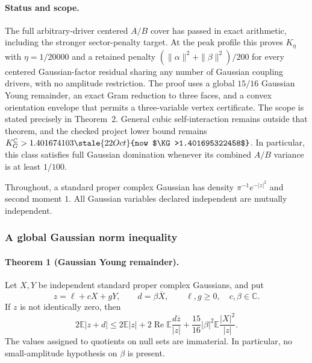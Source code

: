 \paragraph{Status and scope.}
The full arbitrary-driver centered $A/B$ cover has passed in exact
arithmetic, including the stronger sector-penalty target.  At the peak
profile this proves $K_\eta$ with $\eta=1/20000$ and a retained penalty
$(\|\alpha\|^2+\|\beta\|^2)/200$ for every centered Gaussian-factor
residual sharing any number of Gaussian coupling drivers, with no
amplitude restriction.
The proof uses a global $15/16$ Gaussian Young remainder, an exact Gram
reduction to three faces, and a convex orientation envelope that permits a
three-variable vertex certificate.  The scope is stated precisely in
Theorem~2.  General cubic self-interaction remains outside that theorem,
and the checked project lower bound remains
$K_G^{\mathbb C}>1.401674103\stale{22 Oct}{now $\KG>1.401695322458$}$.
In particular, this class satisfies full Gaussian domination whenever
its combined $A/B$ variance is at least $1/100$.

Throughout, a standard proper complex Gaussian has density
$\pi^{-1}e^{-|z|^2}$ and second moment $1$.  All Gaussian variables declared
independent are mutually independent.

\subsubsection{A global Gaussian norm inequality}

\paragraph{Theorem 1 (Gaussian Young remainder).}
Let $X,Y$ be independent standard proper complex Gaussians, and put
\[
 z=\ell+cX+gY,\qquad d=\beta\overline X,
 \qquad \ell,g\ge0,\quad c,\beta\in\mathbb C.
\]
If $z$ is not identically zero, then
\begin{equation}
 \boxed{\quad
 2\mathbb E|z+d|\le 2\mathbb E|z|
  +2\operatorname{Re}\mathbb E\frac{d\overline z}{|z|}
  +\frac{15}{16}|\beta|^2\mathbb E\frac{|X|^2}{|z|}.
 \quad}
 \label{eq:new-young}
\end{equation}
The values assigned to quotients on null sets are immaterial.  In
particular, no small-amplitude hypothesis on $\beta$ is present.

